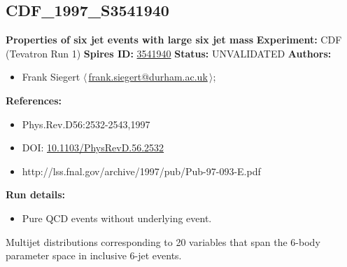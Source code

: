 \subsection[CDF\_1997\_S3541940]{CDF\_1997\_S3541940\,\cite{Abe:1997yb}}
\textbf{Properties of six jet events with large six jet mass}\newline
\textbf{Experiment:} CDF (Tevatron Run 1) \newline
\textbf{Spires ID:} \href{http://www.slac.stanford.edu/spires/find/hep/www?rawcmd=key+3541940}{3541940}\newline
\textbf{Status:} UNVALIDATED\newline
\textbf{Authors:}
\begin{itemize}
  \item Frank Siegert $\langle\,$\href{mailto:frank.siegert@durham.ac.uk}{frank.siegert@durham.ac.uk}$\,\rangle$;
\end{itemize}
\textbf{References:}
\begin{itemize}
  \item Phys.Rev.D56:2532-2543,1997
  \item DOI: \href{http://dx.doi.org/10.1103/PhysRevD.56.2532}{10.1103/PhysRevD.56.2532}
  \item http://lss.fnal.gov/archive/1997/pub/Pub-97-093-E.pdf
\end{itemize}
\textbf{Run details:}
\begin{itemize}

  \item Pure QCD events without underlying event.\end{itemize}

\noindent Multijet distributions corresponding to 20 variables that span the 6-body parameter space in inclusive 6-jet events.

\clearpage


\clearpage

